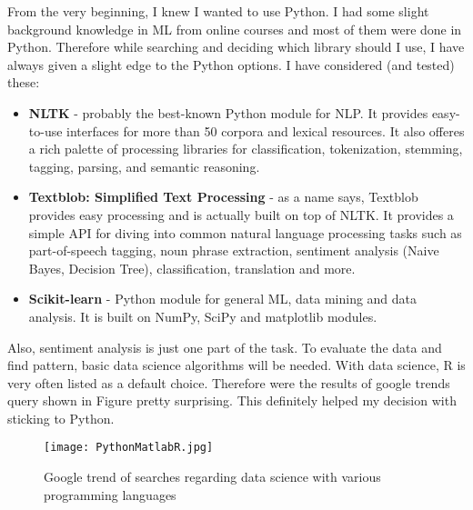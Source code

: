From the very beginning, I knew I wanted to use Python. I had some slight background knowledge in ML from online courses and most of them were done in Python. Therefore while searching and deciding which library should I use, I have always given a slight edge to the Python options. I have considered (and tested) these:
\begin{itemize}
\item \textbf{NLTK} - probably the best-known Python module for NLP. It provides easy-to-use interfaces for more than 50 corpora and lexical resources. It also offeres a rich palette of processing libraries for classification, tokenization, stemming, tagging, parsing, and semantic reasoning.
\item \textbf{Textblob: Simplified Text Processing} - as a name says, Textblob provides easy processing and is actually built on top of NLTK. It provides a simple API for diving into common natural language processing tasks such as part-of-speech tagging, noun phrase extraction, sentiment analysis (Naive Bayes, Decision Tree), classification, translation and more.
\item \textbf{Scikit-learn} - Python module for general ML, data mining and data analysis. It is built on NumPy, SciPy and matplotlib modules.
\end{itemize}

Also, sentiment analysis is just one part of the task. To evaluate the data and find pattern, basic data science algorithms will be needed. With data science, R is very often listed as a default choice. Therefore were the results of google trends query shown in Figure  pretty surprising. This definitely helped my decision with sticking to Python.

\begin{figure}[H]%
    \centering
	\texttt{[image: PythonMatlabR.jpg]}
    \caption{Google trend of searches regarding data science with various programming languages}%
    \label{fig:PythonMatlabR}%
\end{figure}
